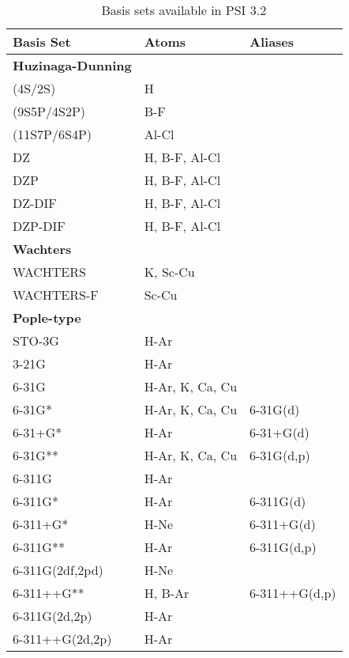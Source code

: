 \begin{table}[tbp]
\caption{~~~Basis sets available in PSI 3.2}

\begin{center}
\begin{tabular}{|l|l|l|}
\hline
\hline
\hline
Basis Set 		&Atoms   	&Aliases\\ 
\hline
\hline
\textbf{Huzinaga-Dunning}		&				&\\
\hline
	(4S/2S)			& H				&\\
	(9S5P/4S2P)		& B-F				&\\
	(11S7P/6S4P)		& Al-Cl			&\\
	DZ			& H, B-F, Al-Cl		&\\
	DZP			& H, B-F, Al-Cl			&\\
	DZ-DIF			& H, B-F, Al-Cl		&\\
	DZP-DIF			& H, B-F, Al-Cl		&\\
\hline
\hline
\textbf{Wachters}			&				&\\
\hline
	WACHTERS		& K, Sc-Cu			&\\
	WACHTERS-F		& Sc-Cu			&\\
\hline
\hline
\textbf{Pople-type}		&				&\\
\hline
	STO-3G			& H-Ar			&\\
	3-21G			& H-Ar			&\\
	6-31G			& H-Ar, K, Ca, Cu	&\\
        6-31G*                  & H-Ar, K, Ca, Cu       &6-31G(d)\\
        6-31+G*                 & H-Ar                  &6-31+G(d)\\
        6-31G**                 & H-Ar, K, Ca, Cu       &6-31G(d,p)\\
	6-311G			& H-Ar			&\\
	6-311G*                 & H-Ar                  &6-311G(d)\\
        6-311+G*                & H-Ne                  &6-311+G(d)\\
	6-311G**                & H-Ar                  &6-311G(d,p)\\
        6-311G(2df,2pd)         & H-Ne                  &\\
	6-311++G**		& H, B-Ar		&6-311++G(d,p)\\
        6-311G(2d,2p)           & H-Ar                  &\\
        6-311++G(2d,2p)         & H-Ar                  &\\

\end{tabular}
\end{center}
\end{table}
